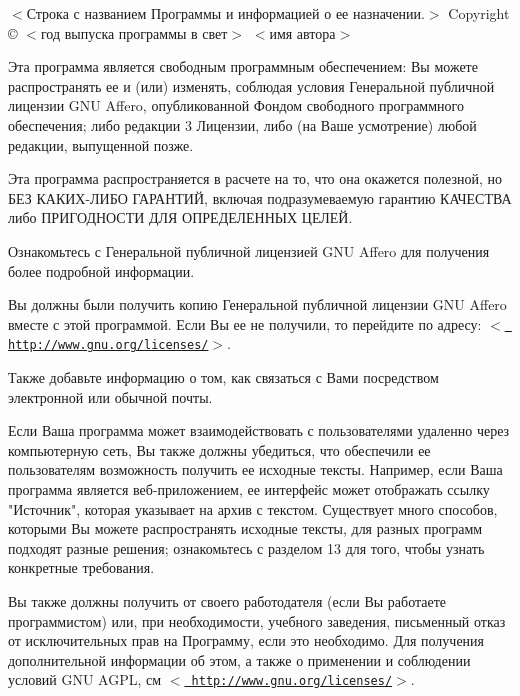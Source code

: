 \texorpdfstring{$<$}{<}Строка с названием Программы и информацией о ее назначении.\texorpdfstring{$>$}{>} Copyright © \texorpdfstring{$<$}{<}год выпуска программы в свет\texorpdfstring{$>$}{>} \texorpdfstring{$<$}{<}имя автора\texorpdfstring{$>$}{>}

Эта программа является свободным программным обеспечением\+: Вы можете распространять ее и (или) изменять, соблюдая условия Генеральной публичной лицензии GNU Affero, опубликованной Фондом свободного программного обеспечения; либо редакции 3 Лицензии, либо (на Ваше усмотрение) любой редакции, выпущенной позже.

Эта программа распространяется в расчете на то, что она окажется полезной, но БЕЗ КАКИХ-\/ЛИБО ГАРАНТИЙ, включая подразумеваемую гарантию КАЧЕСТВА либо ПРИГОДНОСТИ ДЛЯ ОПРЕДЕЛЕННЫХ ЦЕЛЕЙ.

Ознакомьтесь с Генеральной публичной лицензией GNU Affero для получения более подробной информации.

Вы должны были получить копию Генеральной публичной лицензии GNU Affero вместе с этой программой. Если Вы ее не получили, то перейдите по адресу\+: \texorpdfstring{$<$}{<}\href{http://www.gnu.org/licenses/}{\texttt{ http\+://www.\+gnu.\+org/licenses/}}\texorpdfstring{$>$}{>}.

Также добавьте информацию о том, как связаться с Вами посредством электронной или обычной почты.

Если Ваша программа может взаимодействовать с пользователями удаленно через компьютерную сеть, Вы также должны убедиться, что обеспечили ее пользователям возможность получить ее исходные тексты. Например, если Ваша программа является веб-\/приложением, ее интерфейс может отображать ссылку "{}Источник"{}, которая указывает на архив с текстом. Существует много способов, которыми Вы можете распространять исходные тексты, для разных программ подходят разные решения; ознакомьтесь с разделом 13 для того, чтобы узнать конкретные требования.

Вы также должны получить от своего работодателя (если Вы работаете программистом) или, при необходимости, учебного заведения, письменный отказ от исключительных прав на Программу, если это необходимо. Для получения дополнительной информации об этом, а также о применении и соблюдении условий GNU AGPL, см \texorpdfstring{$<$}{<}\href{http://www.gnu.org/licenses/}{\texttt{ http\+://www.\+gnu.\+org/licenses/}}\texorpdfstring{$>$}{>}. 